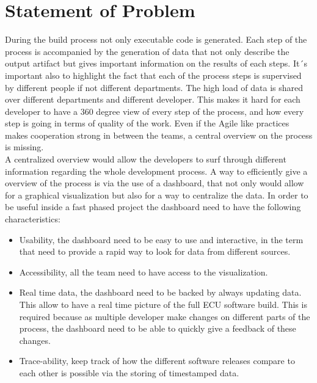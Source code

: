 \documentclass[../main.tex]{subfiles}
\begin{document}
\section{Statement of Problem}
During the build process not only executable code is generated. Each step of the process is accompanied by the generation of data that not only describe the output artifact but gives important information on the results of each steps. It´s important also to highlight the fact that each of the process steps is supervised by different people if not different departments. The high load of data is shared over different departments and different developer. This makes it hard for each developer to have a 360 degree view of every step of the process, and how every step is going in terms of quality of the work. Even if the Agile like practices makes cooperation strong in between the teams,  a central overview on the process is missing.\\
A centralized overview would allow the developers to surf through different information regarding the whole development process. A way to efficiently give a overview of the process is via the use of a dashboard, that not only would allow for a graphical visualization but also for a way to centralize the data. In order to be useful inside a fast phased project the dashboard need to have the following characteristics:
\begin{itemize}
    \item Usability, the dashboard need to be easy to use and interactive, in the term that need to provide a rapid way to look for data from different sources. 
    \item Accessibility, all the team need to have access to the visualization.
    \item Real time data, the dashboard need to be backed by always updating data. This allow to have a real time picture of the full ECU software build. This is required because as multiple developer make changes on different parts of the process, the dashboard need to be able to quickly give a feedback of these changes.
    \item Trace-ability, keep track of how the different software releases compare to each other is possible via the storing of timestamped data. 
\end{itemize}
\end{document}
